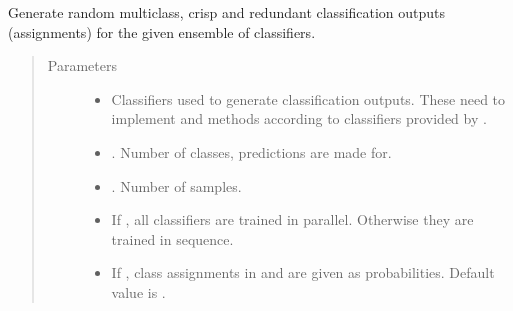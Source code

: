 \documentclass[letterpaper,10pt,english]{sphinxmanual}
\begin{document}
\begin{fulllineitems}
\label{\detokenize{pusion.util.generator:pusion.util.generator.generate_multiclass_ensemble_classification_outputs}}
\sphinxAtStartPar
Generate random multiclass, crisp and redundant classification outputs (assignments) for the given ensemble of
classifiers.
\begin{quote}\begin{description}
\item[{Parameters}] \leavevmode\begin{itemize}
\item {} 
\sphinxAtStartPar
{} \textendash{} Classifiers used to generate classification outputs.
These need to implement  and  methods according to classifiers provided by .

\item {} 
\sphinxAtStartPar
{} \textendash{} . Number of classes, predictions are made for.

\item {} 
\sphinxAtStartPar
{} \textendash{} . Number of samples.

\item {} 
\sphinxAtStartPar
{} \textendash{} If , all classifiers are trained in parallel. Otherwise they are trained in sequence.

\item {} 
\sphinxAtStartPar
{} \textendash{} If , class assignments in  and  are given as
probabilities. Default value is .

\end{itemize}


\end{description}
\end{quote}
\end{fulllineitems}
\end{document}
